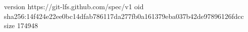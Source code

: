 version https://git-lfs.github.com/spec/v1
oid sha256:14f424e22ee0bc14dfab786117da277fb0a161379eba037b42de97896126fdcc
size 174948
